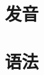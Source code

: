 \documentclass[6pt]{book}
\begin{document}

\frontmatter{}
\tableofcontents{}
\mainmatter{}




% 

\part{发音}






\part{语法}















\backmatter{}
\end{document}
